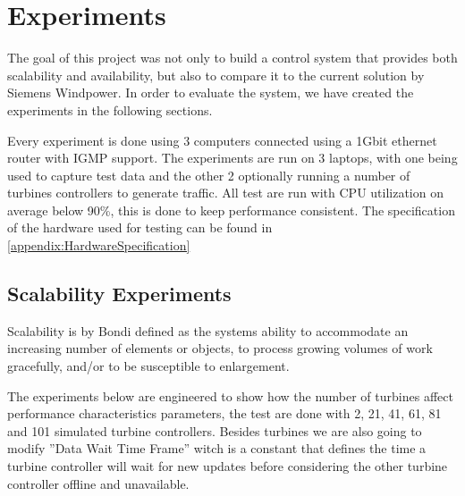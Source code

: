 
\chapter{Experiments}
The goal of this project was not only to build a control system that provides both scalability and availability, but also to compare it to the current solution by Siemens Windpower. 
In order to evaluate the system, we have created the experiments in the following sections.

Every experiment is done using 3 computers connected using a 1Gbit ethernet router with IGMP support.
The experiments are run on 3 laptops, with one being used to capture test data and the other 2 optionally running a number of turbines controllers to generate traffic.
All test are run with CPU utilization on average below 90\%, this is done to keep performance consistent.
The specification of the hardware used for testing can be found in \cref{appendix:HardwareSpecification}

\section{Scalability Experiments}
Scalability is by Bondi\cite{Bondi:2000:CSI:350391.350432} defined as the systems ability to accommodate an increasing number of elements or objects, to process growing volumes of work gracefully, and/or to be susceptible to enlargement. 

The experiments below are engineered to show how the number of turbines affect performance characteristics parameters, the test are done with 2, 21, 41, 61, 81 and 101 simulated turbine controllers. Besides turbines we are also going to modify ''Data Wait Time Frame'' witch is a constant that defines the time a turbine controller will wait for new updates before considering the other turbine controller offline and unavailable.



